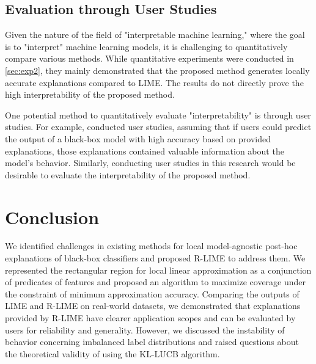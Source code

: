 \documentclass[runningheads]{llncs}
\begin{document}
\subsection{Evaluation through User Studies}
Given the nature of the field of "interpretable machine learning,"
where the goal is to "interpret" machine learning models,
it is challenging to quantitatively compare various methods.
While quantitative experiments were conducted in \cref{sec:exp2},
they mainly demonstrated that the proposed method generates
locally accurate explanations compared to LIME.
The results do not directly prove the high interpretability of the proposed method.

One potential method to quantitatively evaluate "interpretability" is through user studies. For example, \cite{ribeiro2018anchors} conducted user studies, assuming that if users could predict the output of a black-box model with high accuracy based on provided explanations, those explanations contained valuable information about the model's behavior. Similarly, conducting user studies in this research would be desirable to evaluate the interpretability of the proposed method.

\section{Conclusion}
We identified challenges in existing methods for local model-agnostic post-hoc
explanations of black-box classifiers and proposed R-LIME to address them.
We represented the rectangular region for local linear approximation as a
conjunction of predicates of features and proposed an algorithm to
maximize coverage under the constraint of minimum approximation accuracy.
Comparing the outputs of LIME and R-LIME on real-world datasets,
we demonstrated that explanations provided by R-LIME have clearer application
scopes and can be evaluated by users for reliability and generality.
However, we discussed the instability of behavior concerning imbalanced label
distributions and raised questions about the theoretical validity of using
the KL-LUCB algorithm.
\end{document}
